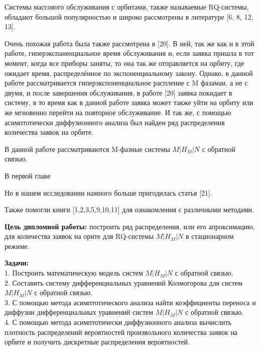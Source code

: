 \hspace*{\parindent}%
Системы массового обслуживания с орбитами, также называемые RQ-системы, обладают большой популярностью и широко рассмотрены в литературе [6, 8, 12, 13]. 

Очень похожая работа была также рассмотрена в [20]. В ней, так же как и в этой работе, гиперэкспаненциальное время обслуживания и, если заявка пришла в тот момент, когда все приборы заняты, то она так же отправляется на орбиту, где ожидает время, распределённое по экспоненциальному закону. Однако, в данной работе рассматривается гиперэкспоненциальное распление с M фазамаи, а не с двумя, и после завершения обслуживания, в работе [20] заявка покидает в систему, в то время как в данной работе заявка может также уйти на орбиту или же мгновенно перейти на повторное обслуживание. И так же, с помощью асимптотически диффузионного анализа был найден ряд распределения количества заявок на орбите.

В данной работе рассматриваются M-фазные системы $M|H_M|N$ с обратной связью.

В первой главе


Но в нашем исследовании намного больше пригодилась статья [21].

Также помогли книги [1,2,3,5,9,10,11] для ознакомления с различными методами.

\textbf{Цель дипломной работы:} построить ряд распределения, или его апроксимацию, для количества заявок на орите для RQ-системы $M|H_M|N$ в стационарном режиме.

\textbf{Задачи:}\\
1. Построить математическую модель систем $M|H_M|N$ с обратной связью.\\
2. Составить систему дифференциальных уравнений Колмогорова для систем $M|H_M|N$ с обратной связью.\\
3. С помощью метода асимптотического анализа найти коэффициенты переноса и диффузии дифференциальных уравнений систем $M|H_M|N$ с обратной связью.\\
4. С помощью метода асимптотически диффузионного анализа вычислить плотность распределений вероятностей произвольного количества заявок на орбите и получить дискретные распределения вероятностей.